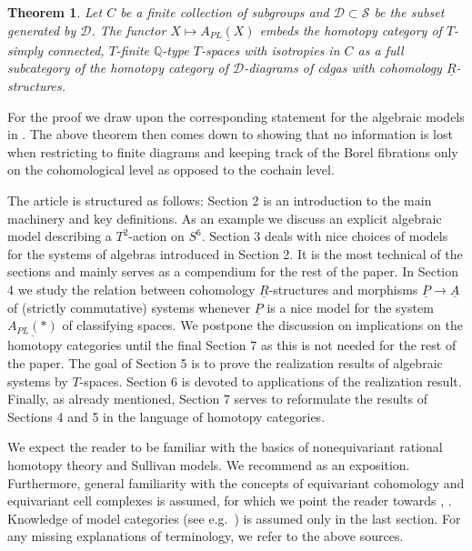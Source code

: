\documentclass[12pt,a4paper]{article}
\newtheorem*{thm*}{Theorem}
\theoremstyle{definition}
\begin{document}
\begin{thm*}
Let $C$ be a finite collection of subgroups and $\mathcal{D}\subset \mathcal{S}$ be the subset generated by $\mathcal{D}$.
The functor $X\mapsto \underline{A_{PL}(X)}$ embeds the homotopy category of $T$-simply connected, $T$-finite $\mathbb{Q}$-type $T$-spaces with isotropies in $C$ as a full subcategory of the homotopy category of $\mathcal{D}$-diagrams of cdgas with cohomology $\underline{R}$-structures.
\end{thm*}

For the proof we draw upon the corresponding statement for the algebraic models in \cite{ScullMendes}. The above theorem then comes down to showing that no information is lost when restricting to finite diagrams and keeping track of the Borel fibrations only on the cohomological level as opposed to the cochain level.


The article is structured as follows: Section 2 is an introduction to the main machinery and key definitions. As an example we discuss an explicit algebraic model describing a $T^2$-action on $S^6$. Section 3 deals with nice choices of models for the systems of algebras introduced in Section 2. It is the most technical of the sections and mainly serves as a compendium for the rest of the paper. In Section 4 we study the relation between cohomology $\underline{R}$-structures and morphisms $\underline{P}\rightarrow \underline{A}$ of (strictly commutative) systems whenever $\underline{P}$ is a nice model for the system $\underline{A_{PL}(*)}$ of classifying spaces. 
We postpone the discussion on implications on the homotopy categories until the final Section 7 as this is not needed for the rest of the paper. The goal of Section 5 is to prove the realization results of algebraic systems by $T$-spaces. Section 6 is devoted to applications of the realization result. Finally, as already mentioned, Section 7 serves to reformulate the results of Sections 4 and 5 in the language of homotopy categories.

We expect the reader to be familiar with the basics of nonequivariant rational homotopy theory and Sullivan models. We recommend \cite{BibelI} as an exposition. Furthermore, general familiarity with the concepts of equivariant cohomology and equivariant cell complexes is assumed, for which we point the reader towards \cite{AP}, \cite{tomDieck}. Knowledge of model categories (see e.g.\ \cite{Hirschhorn}) is assumed only in the last section. For any missing explanations of terminology, we refer to the above sources.
\end{document}
